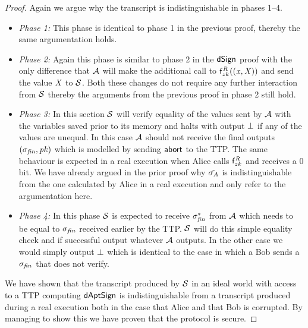 \begin{proof}
    Again we argue why the transcript is indistinguishable in phases 1--4.
    \begin{itemize}
        \item \textit{Phase 1:} This phase is identical to phase 1 in the previous proof, thereby the same argumentation holds.
        \item \textit{Phase 2:} Again this phase is similar to phase 2 in the $\mathsf{dSign}$ proof with the only difference that $\mathcal{A}$ will make the additional call to $\mathsf{f}^{\mathit{R}}_{zk}((\mathit{x}, \mathit{X}))$ and send the value $\mathit{X}$ to $\mathcal{S}$.
        Both these changes do not require any further interaction from $\mathcal{S}$ thereby the arguments from the previous proof in phase 2 still hold.
        \item \textit{Phase 3:} In this section $\mathcal{S}$ will verify equality of the values sent by $\mathcal{A}$ with the variables saved prior to its memory and halts with output $\bot$ if any of the values are unequal.
        In this case $\mathcal{A}$ should not receive the final outputs $(\sigma_{\mathit{fin}}, \mathit{pk})$ which is modelled by sending $\mathsf{abort}$ to the TTP.
        The same behaviour is expected in a real execution when Alice calls $\mathsf{f}^{\mathit{R}}_{zk}$ and receives a 0 bit.
        We have already argued in the prior proof why $\tilde{\sigma_{\mathit{A}}}$ is indistinguishable from the one calculated by Alice in a real execution and only refer to the argumentation here.
        \item \textit{Phase 4:} In this phase $\mathcal{S}$ is expected to receive $\sigma_{\mathit{fin}}^*$ from $\mathcal{A}$ which needs to be equal to $\sigma_{\mathit{fin}}$ received earlier by the TTP.
        $\mathcal{S}$ will do this simple equality check and if successful output whatever $\mathcal{A}$ outputs.
        In the other case we would simply output $\bot$ which is identical to the case in which a Bob sends a $\sigma_{\mathit{fin}}$ that does not verify.
    \end{itemize}

    We have shown that the transcript produced by $\mathcal{S}$ in an ideal world with access to a TTP computing $\mathsf{dAptSign}$ is indistinguishable from a transcript produced during a real execution both in the case that Alice and that Bob is corrupted.
    By managing to show this we have proven that the protocol is secure.
\end{proof}
